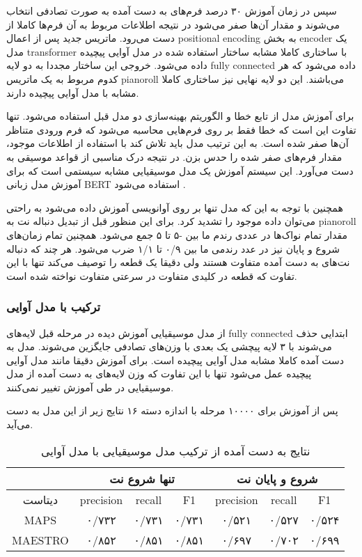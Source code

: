 سپس در زمان آموزش ۳۰ درصد فرم‌های به دست آمده به صورت تصادفی انتخاب می‌شوند و
مقدار آن‌ها صفر می‌شود در نتیجه اطلاعات مربوط به آن فرم‌ها کاملا از دست می‌رود.
ماتریس جدید پس از اعمال \gls{positional encoding} به بخش \gls{encoder} یک مدل
\gls{transformer} با ساختاری کاملا مشابه ساختار استفاده شده در مدل آوایی پیچیده
داده می‌شود. خروجی این ساختار مجددا به دو لایه \gls{fully connected} داده می‌شود
که هر کدوم مربوط به یک ماتریس \gls{pianoroll} می‌باشند. این دو لایه نهایی نیز
ساختاری کاملا مشابه با مدل آوایی پیچیده دارند.

برای آموزش مدل از تابع خطا و الگوریتم بهینه‌سازی دو مدل قبل استفاده می‌شود. تنها
تفاوت این است که خطا فقط بر روی فرم‌هایی محاسبه می‌شود که فرم ورودی متناظر آن‌ها
صفر شده است. به این ترتیب مدل باید تلاش کند با استفاده از اطلاعات موجود، مقدار
فرم‌های صفر شده را حدس بزن. در نتیجه درک مناسبی از قواعد موسیقی به دست می‌آورد.
این سیستم آموزش یک مدل موسیقیایی مشابه سیستمی است که برای آموزش مدل زبانی BERT
استفاده می‌شود \cite{devlin2018bert}.

همچنین با توجه به این که مدل تنها بر روی آوانویسی آموزش داده می‌شود به راحتی
می‌توان داده موجود را تشدید کرد. برای این منظور قبل از تبدیل دنباله نت به
\gls{pianoroll} مقدار تمام نواک‌ها در عددی رندم ما بین -۵ تا ۵ جمع می‌شود.
همچنین تمام زمان‌های شروع و پایان نیز در عدد رندمی ما بین ۰/۹ تا ۱/۱ ضرب می‌شود.
هر چند که دنباله نت‌های به دست آمده متفاوت هستند ولی دقیقا یک قطعه را توصیف
می‌کند تنها با این تفاوت که قطعه در کلیدی متفاوت در سرعتی متفاوت نواخته شده است.

\subsubsection{ترکیب با مدل آوایی}
از مدل موسیقیایی آموزش دیده در مرحله قبل لایه‌های \gls{fully connected} ابتدایی
حذف می‌شوند با ۳ لایه پیچشی یک بعدی با وزن‌های تصادفی جایگزین می‌شوند. مدل به
دست آمده کاملا مشابه مدل آوایی پیچیده است. برای آموزش دقیقا مانند مدل آوایی
پیچیده عمل می‌شود تنها با این تفاوت که وزن لایه‌های به دست آمده از مدل موسیقیایی
در طی آموزش تغییر نمی‌کنند.

پس از آموزش برای ۱۰۰۰۰ مرحله با اندازه دسته ۱۶ نتایج زیر از این مدل به دست
می‌آید.
\begin{table}[ht]
    \centering
    \begin{tabular}{|c|c|c|c|c|c|c|}
        \hline
        & \multicolumn{3}{|c|}{تنها شروع نت} & \multicolumn{3}{|c|}{شروع و پایان نت} \\
        \hline
        دیتاست & \gls{precision} & \gls{recall} & F1 & \gls{precision} & \gls{recall} & F1 \\
        \hline
        MAPS & ۰/۷۳۲ & ۰/۷۳۱ & ۰/۷۳۱ & ۰/۵۲۱ & ۰/۵۲۷ & ۰/۵۲۴ \\
        \hline
        MAESTRO & ۰/۸۵۲ & ۰/۸۵۱ & ۰/۸۵۱ & ۰/۶۹۷ & ۰/۷۰۲ & ۰/۶۹۹ \\
        \hline
    \end{tabular}
    \caption{نتایج به دست آمده از ترکیب مدل موسیقیایی با مدل آوایی}
\end{table}


